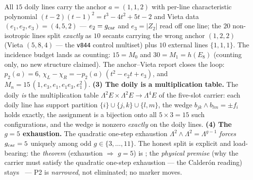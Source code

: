 \begin{keybox}
\noindent All $15$ doily lines carry the anchor $a = (1,1,2)$
with per-line characteristic polynomial $(t-2)(t-1)^2 = t^3 -
4t^2 + 5t - 2$ and Vieta data $(e_1, e_2, e_3) = (4, 5, 2)$ ---
$e_2 = g_{\mathrm{car}}$ and $e_3 = |Z_2|$ read off one line; the $20$
non-isotropic lines split \emph{exactly} as $10$ secants carrying
the wrong anchor $(1,2,2)$ (Vieta $(5,8,4)$ --- the
\texttt{v844} control multiset) plus $10$ external lines
$\{1,1,1\}$.  The incidence budget lands as counting: $15 = M_0$
and $30 = M_1 = h(E_8)$ (counting only, no new structure
claimed).  The anchor--Vieta report closes the loop: $p_2(a) =
6$, $\chi_L - \chi_R = -p_2(a)\,(t^2 - e_2 t + e_3)$, and $M_n =
15\,(1, e_3, e_1, e_1 e_3, e_1^2)$.  \textbf{(3) The doily is a
multiplication table.}  The doily \emph{is} the multiplication
table $\Lambda^2 E \times \Lambda^2 E \to \Lambda^4 E$ of the
five-slot carrier: each doily line has support partition $\{i\}
\cup \{j,k\} \cup \{l,m\}$, the wedge $b_{jk} \wedge b_{lm} =
\pm f_i$ holds exactly, the assignment is a bijection onto all
$5\times3 = 15$ such configurations, and the wedge is nonzero
\emph{exactly} on the doily lines.  \textbf{(4) The $g = 5$
exhaustion.}  The quadratic one-step exhaustion $\Lambda^2 \wedge
\Lambda^2 = \Lambda^{g-1}$ \emph{forces} $g_{\mathrm{car}} = 5$ uniquely
among odd $g \in \{3, \dots, 11\}$.  The honest split is explicit
and load-bearing: the \emph{theorem} (exhaustion $\Rightarrow$
$g = 5$) is \mE; the \emph{physical premise} (why the carrier
must satisfy the quadratic one-step exhaustion --- the Calder\'on
reading) stays \mO\ --- P2 is \emph{narrowed}, not eliminated; no
marker moves.
\end{keybox}

